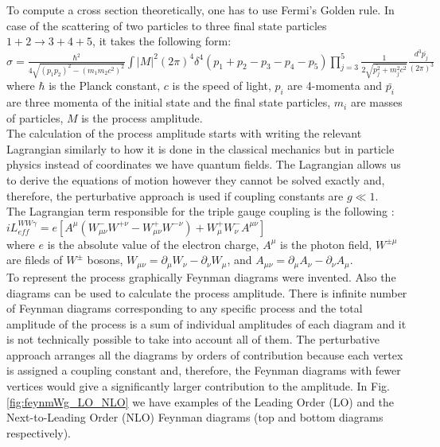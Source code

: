 
To compute a cross section theoretically, one has to use Fermi's Golden rule. In case of the scattering of two particles to three final state particles $1+2\rightarrow 3+4+5$, it takes the following form:\\

$\sigma = \frac{ \hbar^2 }{4\sqrt{(p_1p_2)^2-(m_1m_2c^2)^2}} \int |M|^2 (2\pi)^4 \delta^4(p_1+p_2-p_3-p_4-p_5) \prod_{j=3}^{5} \frac{1}{2 \sqrt{\bar{p_j^2}+m_j^2 c^2}}\frac{d^3\bar{p_j}}{(2\pi)^3} $ \\ 
where $\hbar$ is the Planck constant, $c$ is the speed of light, $p_i$ are 4-momenta and ${\bar{p_i}}$ are three momenta of the initial state and the final state particles, $m_i$ are masses of particles, $M$ is the process amplitude.\\ 

The calculation of the process amplitude starts with writing the relevant Lagrangian similarly to how it is done in the classical mechanics but in particle physics instead of coordinates we have quantum fields. The Lagrangian allows us to derive the equations of motion however they cannot be solved exactly and, therefore, the perturbative approach is used if coupling constants are $g \ll 1$.\\

The Lagrangian term responsible for the triple gauge coupling is the following \cite{ref_theory_aTGC}:\\

$i L_{eff}^{WW\gamma}= e [ A^\mu (W_{\mu\nu}^- W^{+\nu} - W_{\mu\nu}^+ W^{-\nu}) + W_{\mu}^+ W_{\nu}^- A^{\mu\nu} ] $\\

where $e$ is the absolute value of the electron charge, $A^\mu$ is the photon field, $W^{\pm\mu}$ are fileds of $W^\pm$ bosons, $W_{\mu\nu}=\partial_\mu W_\nu - \partial_\nu W_\mu$, and $A_{\mu\nu}=\partial_\mu A_\nu - \partial_\nu A_\mu$.\\

To represent the process graphically Feynman diagrams were invented. Also the diagrams can be used to calculate the process amplitude. There is infinite number of Feynman diagrams corresponding to any specific process and the total amplitude of the process is a sum of individual amplitudes of each diagram and it is not technically possible to take into account all of them. The perturbative approach arranges all the diagrams by orders of contribution because each vertex is assigned a coupling constant and, therefore, the Feynman diagrams with fewer vertices would give a significantly larger contribution to the amplitude. In Fig. \ref{fig:feynmWg_LO_NLO} we have examples of the Leading Order (LO) and the Next-to-Leading Order (NLO) Feynman diagrams (top and bottom diagrams respectively).\\

